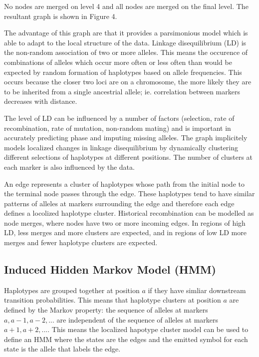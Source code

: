 \documentclass[a4paper,10pt,twoside,abstraction,titlepage]{article}
\begin{document}
\noindent No nodes are merged on level 4 and all nodes are merged on the final level.  The resultant graph is shown in Figure 4.

The advantage of this graph are that it provides a parsimonious model which is able to adapt to the local structure of the data.  Linkage disequilibrium (LD) is the non-random association of two or more alleles.  This means the occurence of combinations of alleles which occur more often or less often than would be expected by random formation of haplotypes based on allele frequencies.  This occurs because the closer two loci are on a chromosome, the more likely they are to be inherited from a single ancestrial allele; ie. correlation between markers decreases with distance.

The level of LD can be influenced by a number of factors (selection, rate of recombination, rate of mutation, non-random mating) and is important in accurately predicting phase and imputing missing alleles.  The graph implicitely models localized changes in linkage disequilibrium by dynamically clustering different selections of haplotypes at different positions.  The number of clusters at each marker is also influenced by the data.

An edge represents a cluster of haplotypes whose path from the initial node to the terminal node passes through the edge.  These haplotypes tend to have similar patterns of alleles at markers surrounding the edge and therefore each edge defines a locolized haplotype cluster.  Historical recombination can be modelled as node merges, where nodes have two or more incoming edges.  In regions of high LD, less merges and more clusters are expected, and in regions of low LD more merges and fewer haplotype clusters are expected.



\newpage

\subsection{Induced Hidden Markov Model (HMM)}
Haplotypes are grouped together at position $a$ if they have simliar downstream transition probabilities.  This means that haplotype clusters at position $a$ are defined by the Markov property: the sequence of alleles at markers $a, a-1, a-2, ...$ are independent of the sequence of alleles at markers $a+1, a+2, ...$.  This means the localized hapotype cluster model can be used to define an HMM where the states are the edges and the emitted symbol for each state is the allele that labels the edge.
\end{document}
